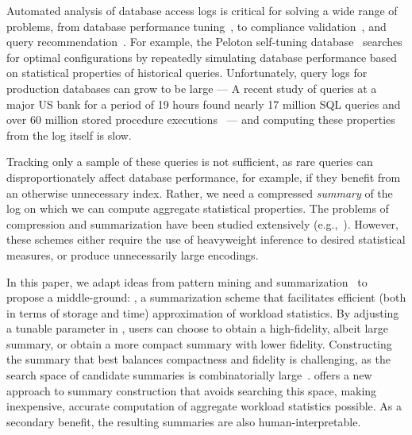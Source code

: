 Automated analysis of database access logs is critical for solving a wide range of problems, from database performance tuning~\cite{DBLP:conf/sigmod/BrunoC05}, to compliance validation~\cite{DBLP:conf/icalp/Dwork06}, and query recommendation~\cite{DBLP:journals/debu/ChatzopoulouEKMPV11}. 
For example, the Peloton self-tuning database~\cite{DBLP:conf/cidr/PavloAALLMMMPQS17} searches for optimal configurations by repeatedly simulating database performance based on statistical properties of historical queries.
Unfortunately, query logs for production databases can grow to be large ---
A recent study of queries at a major US bank for a period of 19 hours found nearly 17 million SQL queries and over 60 million stored procedure executions~\cite{DBLP:conf/www/KulLXCCKU16} --- and computing these properties from the log itself is slow.

Tracking only a sample of these queries is not sufficient, as rare queries can disproportionately affect database performance, for example, if they benefit from an otherwise unnecessary index.
Rather, we need a compressed \emph{summary} of the log on which we can compute aggregate statistical properties.
The problems of compression and summarization have been studied extensively (e.g.,~\cite{DBLP:journals/tit/ZivL77,DBLP:journals/tit/ZivL78,4051119,lee1999learning,DBLP:reference/stat/Jolliffe11,DBLP:journals/cacm/Blei12,DBLP:conf/acl/WangZLG09,DBLP:journals/ai/KnightM02}). 
However, these schemes either require the use of heavyweight inference to desired statistical measures, or produce unnecessarily large encodings.

In this paper, we adapt ideas from pattern mining and summarization~\cite{DBLP:journals/tkdd/MampaeyVT12,DBLP:journals/pvldb/GebalyAGKS14} to propose a middle-ground: \systemnameone, a summarization scheme that facilitates efficient (both in terms of storage and time) approximation of workload statistics.
By adjusting a tunable parameter in \systemnameone, users can choose to obtain a high-fidelity, albeit large summary, or obtain a more compact summary with lower fidelity.
Constructing the summary that best balances compactness and fidelity is challenging, as the search space of candidate summaries is combinatorially large~\cite{DBLP:journals/tkdd/MampaeyVT12,DBLP:journals/pvldb/GebalyAGKS14}.
\systemnameone offers a new approach to summary construction that avoids searching this space, making inexpensive, accurate computation of aggregate workload statistics possible.
As a secondary benefit, the resulting summaries are also human-interpretable.


